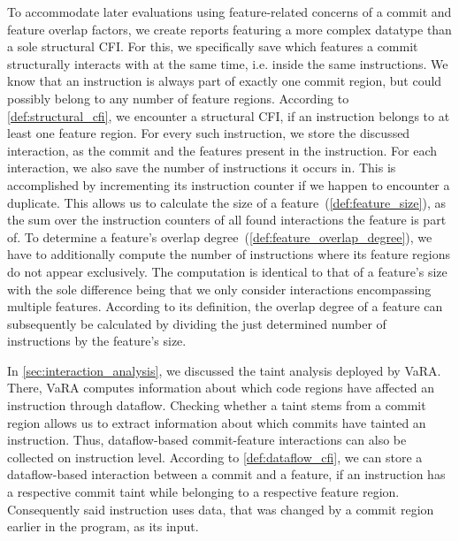 To accommodate later evaluations using feature-related concerns of a commit and feature overlap factors, we create reports featuring a more complex datatype than a sole structural CFI.
For this, we specifically save which features a commit structurally interacts with at the same time, i.e. inside the same instructions.
We know that an instruction is always part of exactly one commit region, but could possibly belong to any number of feature regions.
According to \autoref{def:structural_cfi}, we encounter a structural CFI, if an instruction belongs to at least one feature region.
For every such instruction, we store the discussed interaction, as the commit and the features present in the instruction.
For each interaction, we also save the number of instructions it occurs in. 
This is accomplished by incrementing its instruction counter if we happen to encounter a duplicate. 
This allows us to calculate the size of a feature~(\autoref{def:feature_size}), as the sum over the instruction counters of all found interactions the feature is part of.
To determine a feature's overlap degree~(\autoref{def:feature_overlap_degree}), we have to additionally compute the number of instructions where its feature regions do not appear exclusively.
The computation is identical to that of a feature's size with the sole difference being that we only consider interactions encompassing multiple features.
According to its definition, the overlap degree of a feature can subsequently be calculated by dividing the just determined number of instructions by the feature's size.

In \autoref{sec:interaction_analysis}, we discussed the taint analysis deployed by VaRA.
There, VaRA computes information about which code regions have affected an instruction through dataflow.
Checking whether a taint stems from a commit region allows us to extract information about which commits have tainted an instruction.
Thus, dataflow-based commit-feature interactions can also be collected on instruction level.
According to \autoref{def:dataflow_cfi}, we can store a dataflow-based interaction between a commit and a feature, if an instruction has a respective commit taint while belonging to a respective feature region.
Consequently said instruction uses data, that was changed by a commit region earlier in the program, as its input. 

\iffalse
For our research we examine numerous software projects to get a wide range of reference data, as commit-feature interactions could potentially vary greatly between different code spaces.
Accordingly, the VaRA-Tool-Suite was extended making it possible to generate a report comprising all found CFIs of an according type in a software project.
This aids us in examining several software projects to gain sufficient and sensible data about commit-feature interactions.
The created reports are also evaluated in the VaRA-Tool-Suite, which offers support to process and display statstics of the generated data. \\
\fi 
